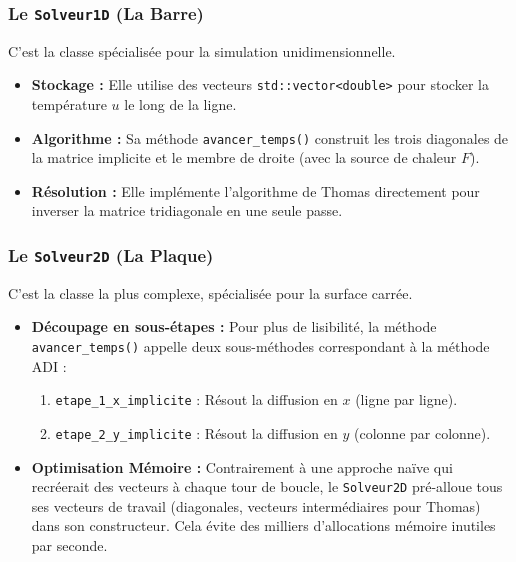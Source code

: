 \documentclass[a4paper,12pt]{article}
\begin{document}
\subsubsection{Le \texttt{Solveur1D} (La Barre)}
C'est la classe spécialisée pour la simulation unidimensionnelle.
\begin{itemize}
    \item \textbf{Stockage :} Elle utilise des vecteurs \texttt{std::vector<double>} pour stocker la température $u$ le long de la ligne.
    \item \textbf{Algorithme :} Sa méthode \texttt{avancer\_temps()} construit les trois diagonales de la matrice implicite et le membre de droite (avec la source de chaleur $F$).
    \item \textbf{Résolution :} Elle implémente l'algorithme de Thomas directement pour inverser la matrice tridiagonale en une seule passe.
\end{itemize}

\subsubsection{Le \texttt{Solveur2D} (La Plaque)}
C'est la classe la plus complexe, spécialisée pour la surface carrée.
\begin{itemize}
    \item \textbf{Découpage en sous-étapes :} Pour plus de lisibilité, la méthode \texttt{avancer\_temps()} appelle deux sous-méthodes correspondant à la méthode ADI :
    \begin{enumerate}
        \item \texttt{etape\_1\_x\_implicite} : Résout la diffusion en $x$ (ligne par ligne).
        \item \texttt{etape\_2\_y\_implicite} : Résout la diffusion en $y$ (colonne par colonne).
    \end{enumerate}
    \item \textbf{Optimisation Mémoire :} Contrairement à une approche naïve qui recréerait des vecteurs à chaque tour de boucle, le \texttt{Solveur2D} pré-alloue tous ses vecteurs de travail (diagonales, vecteurs intermédiaires pour Thomas) dans son constructeur. Cela évite des milliers d'allocations mémoire inutiles par seconde.
\end{itemize}
\end{document}

